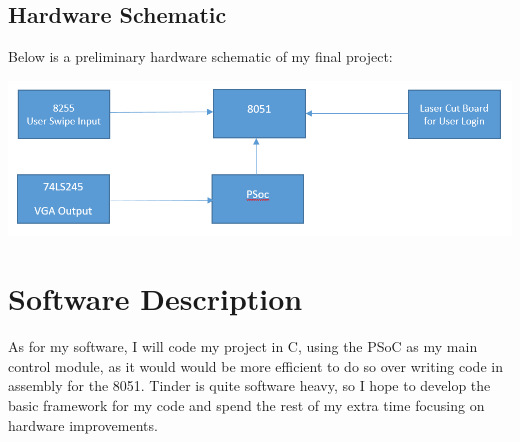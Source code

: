 \documentclass[12pt,twoside]{article}
\begin{document}
\subsection{Hardware Schematic}
Below is a preliminary hardware schematic of my final project:
\begin{center}\includegraphics[width = 150mm]{Hardware.png} \end{center}

\section{Software Description}
As for my software, I will code my project in C, using the PSoC as my main control module, as it would would be more efficient to do so over writing code in assembly for the 8051. Tinder is quite software heavy, so I hope to develop the basic framework for my code and spend the rest of my extra time focusing on hardware improvements. 
\end{document}
